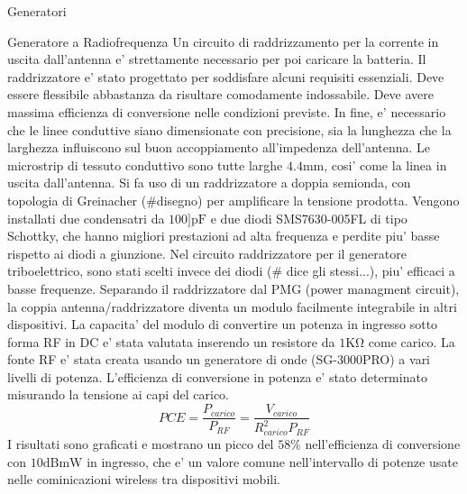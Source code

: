 \begin{section}{Generatori}
\begin{subsection}{Generatore a Radiofrequenza}
        Un circuito di raddrizzamento per la corrente in uscita dall'antenna e' strettamente necessario per poi caricare la batteria. Il raddrizzatore e' stato progettato per soddisfare alcuni requisiti essenziali. Deve essere flessibile abbastanza da risultare comodamente indossabile. Deve avere massima efficienza di conversione nelle condizioni previste. In fine, e' necessario che le linee conduttive siano dimensionate con precisione, sia la lunghezza che la larghezza influiscono sul buon accoppiamento all'impedenza dell'antenna. Le microstrip di tessuto conduttivo sono tutte larghe \(4.4\mathrm{mm}\), cosi' come la linea in uscita dall'antenna. Si fa uso di un raddrizzatore a doppia semionda, con topologia di Greinacher (\#disegno) per amplificare la tensione prodotta. Vengono installati due condensatri da \(100]\mathrm{pF}\) e due diodi SMS7630-005FL di tipo Schottky, che hanno migliori prestazioni ad alta frequenza e perdite piu' basse rispetto ai diodi a giunzione. Nel circuito raddrizzatore per il generatore triboelettrico, sono stati scelti invece dei diodi (\# dice gli stessi...), piu' efficaci a basse frequenze. Separando il raddrizzatore dal PMG (power managment circuit), la coppia antenna/raddrizzatore diventa un modulo facilmente integrabile in altri dispositivi. La capacita' del modulo di convertire un potenza in ingresso sotto forma RF in DC e' stata valutata inserendo un resistore da \(1\mathrm{K\Omega}\) come carico. La fonte RF e' stata creata usando un generatore di onde (SG-3000PRO) a vari livelli di potenza. L'efficienza di conversione in potenza e' stato determinato misurando la tensione ai capi del carico. 
        \begin{equation*}
            PCE = \frac{P_{carico}}{P_{RF}} = \frac{V_{carico}}{R_{carico}^2P_{RF}}
        \end{equation*}
        I risultati sono graficati e mostrano un picco del \(58\%\) nell'efficienza di conversione con \(10\mathrm{dBmW}\) in ingresso, che e' un valore comune nell'intervallo di potenze usate nelle cominicazioni wireless tra dispositivi mobili. 
    \end{subsection}
\end{section}

